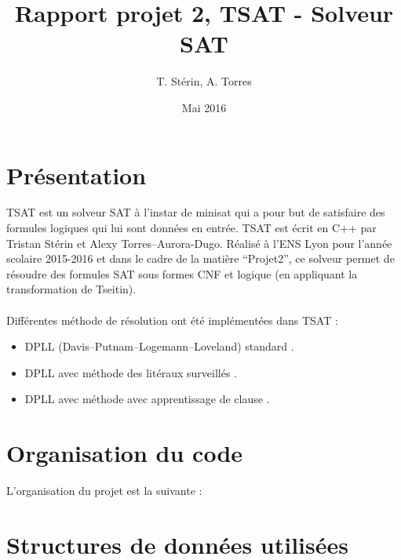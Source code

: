 \documentclass{article}
\title{Rapport projet 2, TSAT - Solveur SAT}
\author{T. Stérin, A. Torres}
\date{Mai 2016}
\newcommand{\litt}{\alpha}
\newcommand{\non}[1]{\overline{#1}}
\begin{document}
\maketitle

\section{Présentation}
TSAT est un solveur SAT à l'instar de minisat \cite{minisat} qui a pour but de satisfaire des formules logiques qui lui sont données en entrée.
TSAT est écrit en C++ par Tristan Stérin et Alexy Torres--Aurora-Dugo.
Réalisé à l'ENS Lyon pour l'année scolaire 2015-2016 et dans le cadre de la matière ``Projet2'', ce solveur permet de résoudre des formules SAT sous formes CNF et logique (en appliquant la transformation de Tseitin).
\\ \\
Différentes méthode de résolution ont été implémentées dans TSAT : 
\begin{itemize}
	\item DPLL (Davis–Putnam–Logemann–Loveland) standard \cite{DPLL}.
	\item DPLL avec méthode des litéraux surveillés \cite{WL}.
	\item DPLL avec méthode avec apprentissage de clause \cite{CL}.
\end{itemize}


\section{Organisation du code}
L'organisation du projet est la suivante :
\section{Structures de données utilisées}
\end{document}
